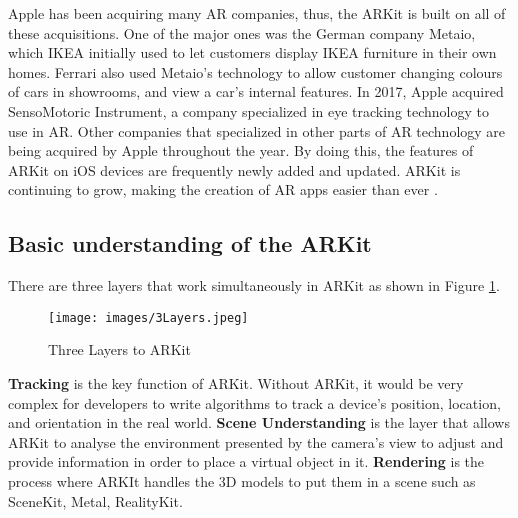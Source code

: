 Apple has been acquiring many AR companies, thus, the ARKit is built on all of these acquisitions. One of the major ones was the German company Metaio, which IKEA initially used to let customers display IKEA furniture in their own homes. Ferrari also used Metaio’s technology to allow customer changing colours of cars in showrooms, and view a car’s internal features. In 2017, Apple acquired SensoMotoric Instrument, a company specialized in eye tracking technology to use in AR. Other companies that specialized in other parts of AR technology are being acquired by Apple throughout the year. By doing this, the features of ARKit on iOS devices are frequently newly added and updated. ARKit is continuing to grow, making the creation of AR apps easier than ever \parencite{wang_beginning_2018}.

\subsection{Basic understanding of the ARKit}
There are three layers that work simultaneously in ARKit \parencite{noauthor_introduction_nodate-1} as shown in Figure \ref{fig:3Layers}.
\begin{figure}[!htp]
	\centering
	\texttt{[image: images/3Layers.jpeg]}
	\caption{Three Layers to ARKit}
	\label{fig:3Layers}
\end{figure}

\textbf{Tracking} is the key function of ARKit. Without ARKit, it would be very complex for developers to write algorithms to track a device’s position, location, and orientation in the real world.
\textbf{Scene Understanding} is the layer that allows ARKit to analyse the environment presented by the camera’s view to adjust and provide information in order to place a virtual object in it. 
\textbf{Rendering} is the process where ARKIt handles the 3D models to put them in a scene such as SceneKit, Metal, RealityKit.

